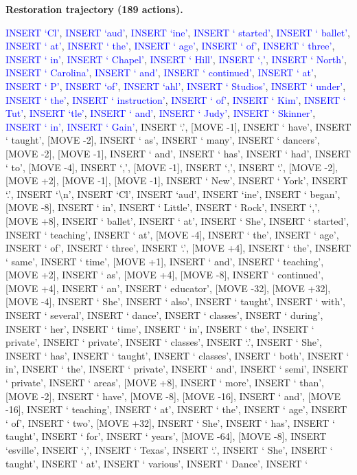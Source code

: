 \documentclass[11pt]{article}
\begin{document}
\vspace{0.4em}
\textbf{Restoration trajectory (189 actions).}\par
{
\ttfamily\scriptsize\raggedright\setlength{\parindent}{0pt}
\textcolor{blue}{INSERT `Cl'}, \textcolor{blue}{INSERT `aud'}, \textcolor{blue}{INSERT `ine'}, \textcolor{blue}{INSERT ` started'}, \textcolor{blue}{INSERT ` ballet'}, \textcolor{blue}{INSERT ` at'}, \textcolor{blue}{INSERT ` the'}, \textcolor{blue}{INSERT ` age'}, \textcolor{blue}{INSERT ` of'}, \textcolor{blue}{INSERT ` three'}, \textcolor{blue}{INSERT ` in'}, \textcolor{blue}{INSERT ` Chapel'}, \textcolor{blue}{INSERT ` Hill'}, \textcolor{blue}{INSERT `,'}, \textcolor{blue}{INSERT ` North'}, \textcolor{blue}{INSERT ` Carolina'}, \textcolor{blue}{INSERT ` and'}, \textcolor{blue}{INSERT ` continued'}, \textcolor{blue}{INSERT ` at'}, \textcolor{blue}{INSERT ` P'}, \textcolor{blue}{INSERT `of'}, \textcolor{blue}{INSERT `ahl'}, \textcolor{blue}{INSERT ` Studios'}, \textcolor{blue}{INSERT ` under'}, \textcolor{blue}{INSERT ` the'}, \textcolor{blue}{INSERT ` instruction'}, \textcolor{blue}{INSERT ` of'}, \textcolor{blue}{INSERT ` Kim'}, \textcolor{blue}{INSERT ` Tut'}, \textcolor{blue}{INSERT `tle'}, \textcolor{blue}{INSERT ` and'}, \textcolor{blue}{INSERT ` Judy'}, \textcolor{blue}{INSERT ` Skinner'}, \textcolor{blue}{INSERT ` in'}, \textcolor{blue}{INSERT ` Gain'}, INSERT `.', [MOVE -1], INSERT ` have', INSERT ` taught', [MOVE -2], INSERT ` as', INSERT ` many', INSERT ` dancers', [MOVE -2], [MOVE -1], INSERT ` and', INSERT ` has', INSERT ` had', INSERT ` to', [MOVE -4], INSERT `,', [MOVE -1], INSERT `,', INSERT `.', [MOVE -2], [MOVE +2], [MOVE -1], [MOVE -1], INSERT ` New', INSERT ` York', INSERT `.', INSERT `\textbackslash{}n', INSERT `Cl', INSERT `aud', INSERT `ine', INSERT ` began', [MOVE -8], INSERT ` in', INSERT ` Little', INSERT ` Rock', INSERT `,', [MOVE +8], INSERT ` ballet', INSERT ` at', INSERT ` She', INSERT ` started', INSERT ` teaching', INSERT ` at', [MOVE -4], INSERT ` the', INSERT ` age', INSERT ` of', INSERT ` three', INSERT `.', [MOVE +4], INSERT ` the', INSERT ` same', INSERT ` time', [MOVE +1], INSERT ` and', INSERT ` teaching', [MOVE +2], INSERT ` as', [MOVE +4], [MOVE -8], INSERT ` continued', [MOVE +4], INSERT ` an', INSERT ` educator', [MOVE -32], [MOVE +32], [MOVE -4], INSERT ` She', INSERT ` also', INSERT ` taught', INSERT ` with', INSERT ` several', INSERT ` dance', INSERT ` classes', INSERT ` during', INSERT ` her', INSERT ` time', INSERT ` in', INSERT ` the', INSERT ` private', INSERT ` private', INSERT ` classes', INSERT `.', INSERT ` She', INSERT ` has', INSERT ` taught', INSERT ` classes', INSERT ` both', INSERT ` in', INSERT ` the', INSERT ` private', INSERT ` and', INSERT ` semi', INSERT ` private', INSERT ` areas', [MOVE +8], INSERT ` more', INSERT ` than', [MOVE -2], INSERT ` have', [MOVE -8], [MOVE -16], INSERT ` and', [MOVE -16], INSERT ` teaching', INSERT ` at', INSERT ` the', INSERT ` age', INSERT ` of', INSERT ` two', [MOVE +32], INSERT ` She', INSERT ` has', INSERT ` taught', INSERT ` for', INSERT ` years', [MOVE -64], [MOVE -8], INSERT `esville', INSERT `,', INSERT ` Texas', INSERT `.', INSERT ` She', INSERT ` taught', INSERT ` at', INSERT ` various', INSERT ` Dance', INSERT ` }
\end{document}
